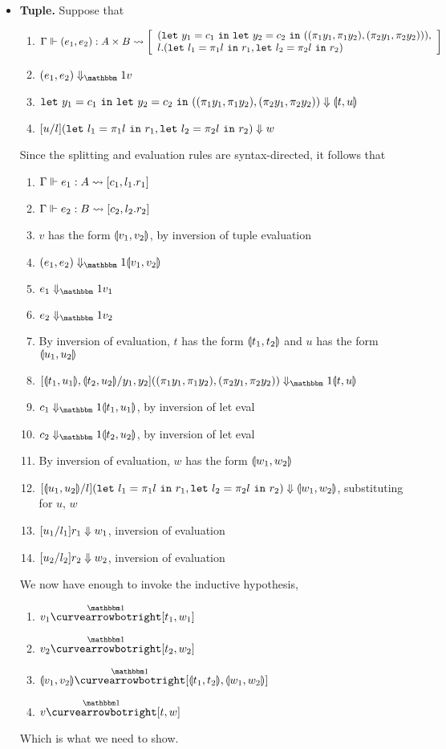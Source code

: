 \documentclass{article}
\begin{document}
\begin{itemize}
\item {\bf Tuple.} Suppose that
\begin{enumerate}
\item ${\Gamma} \Vdash {(e_1,e_2)}:{A\times B} \rightsquigarrow \left[{ \begin{array}{l}
		({\tt let}~{y_1} = {c_1}~{\tt in}~{{\tt let}~{y_2} = {c_2}~{\tt in}~{((\pi_1 y_1, \pi_1 y_2),(\pi_2 y_1, \pi_2 y_2))}}), \\
		l.({\tt let}~{l_1} = {\pi_1 l}~{\tt in}~{r_1},{\tt let}~{l_2} = {\pi_2 l}~{\tt in}~{r_2})
		\end{array}}\right] $
\item $\reduceone{(e_1,e_2)}{v}$
\item ${{\tt let}~{y_1} = {c_1}~{\tt in}~{{\tt let}~{y_2} = {c_2}~{\tt in}~{((\pi_1 y_1, \pi_1 y_2),(\pi_2 y_1, \pi_2 y_2))}}} \Downarrow {\llparenthesis{t},{u}\rrparenthesis}$
\item ${[u/l]({\tt let}~{l_1} = {\pi_1 l}~{\tt in}~{r_1},{\tt let}~{l_2} = {\pi_2 l}~{\tt in}~{r_2})} \Downarrow {w}$
\end{enumerate}
Since the splitting and evaluation rules are syntax-directed, it follows that
\begin{enumerate}
\item ${\Gamma} \Vdash {e_1}:{A} \rightsquigarrow \left[{c_1,l_1.r_1}\right]$
\item ${\Gamma} \Vdash {e_2}:{B} \rightsquigarrow \left[{c_2,l_2.r_2}\right]$
\item $v$ has the form $\llparenthesis{v_1},{v_2}\rrparenthesis$, by inversion of tuple evaluation
\item $\reduceone{(e_1,e_2)}{\valprod{v_1}{v_2}}$
\item $\reduceone{e_1}{v_1}$
\item $\reduceone{e_2}{v_2}$
\item By inversion of evaluation, $t$ has the form $\llparenthesis{t_1},{t_2}\rrparenthesis$  and $u$ has the form $\llparenthesis{u_1},{u_2}\rrparenthesis$
\item $\reduceone{[\valprod{t_1}{u_1},\valprod{t_2}{u_2}/y_1,y_2]((\pi_1 y_1, \pi_1 y_2),(\pi_2 y_1, \pi_2 y_2))}{\valprod tu}$
\item $\reduceone{c_1}{\valprod {t_1}{u_1}}$, by inversion of let eval
\item $\reduceone{c_2}{\valprod {t_2}{u_2}}$, by inversion of let eval
\item By inversion of evaluation, $w$ has the form $\llparenthesis{w_1},{w_2}\rrparenthesis$
\item ${[\llparenthesis{u_1},{u_2}\rrparenthesis/l]({\tt let}~{l_1} = {\pi_1 l}~{\tt in}~{r_1},{\tt let}~{l_2} = {\pi_2 l}~{\tt in}~{r_2})} \Downarrow {\llparenthesis{w_1},{w_2}\rrparenthesis}$, substituting for $u$, $w$
\item ${[u_1/l_1]r_1} \Downarrow {w_1}$, inversion of evaluation
\item ${[u_2/l_2]r_2} \Downarrow {w_2}$, inversion of evaluation
\end{enumerate}
We now have enough to invoke the inductive hypothesis,
\begin{enumerate}
\item $v_1 \vsplito [t_1,w_1]$ 
\item $v_2 \vsplito [t_2,w_2]$ 
\item $\valprod{v_1}{v_2} \vsplito [\valprod{t_1}{t_2},\valprod{w_1}{w_2}]$ 
\item $v \vsplito [t,w]$
\end{enumerate}
Which is what we need to show.


\end{itemize}
\end{document}
